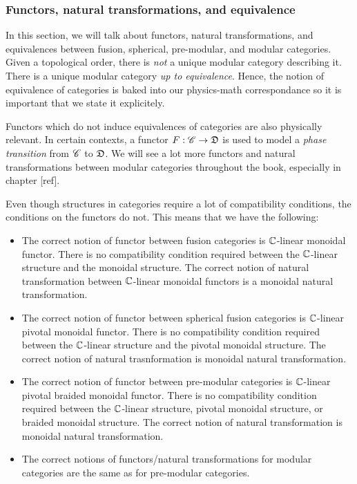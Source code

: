 \subsubsection{Functors, natural transformations, and equivalence}

In this section, we will talk about functors, natural transformations, and equivalences between fusion, spherical, pre-modular, and modular categories. Given a topological order, there is \textit{not} a unique modular category describing it. There is a unique modular category \textit{up to equivalence}. Hence, the notion of equivalence of categories is baked into our physics-math correspondance so it is important that we state it explicitely.

Functors which do not induce equivalences of categories are also physically relevant. In certain contexts, a functor $F:\mathscr{C}\to \mathfrak{D}$ is used to model a \textit{phase transition} from $\mathscr{C}$ to $\mathfrak{D}$. We will see a lot more functors and natural transformations between modular categories throughout the book, especially in chapter [ref].

Even though structures in categories require a lot of compatibility conditions, the conditions on the functors do not. This means that we have the following:

\begin{itemize}
\item The correct notion of functor between fusion categories is $\mathbb{C}$-linear monoidal functor. There is no compatibility condition required between the $\mathbb{C}$-linear structure and the monoidal structure. The correct notion of natural transformation between $\mathbb{C}$-linear monoidal functors is a monoidal natural transformation.

\item The correct notion of functor between spherical fusion categories is $\mathbb{C}$-linear pivotal monoidal functor. There is no compatibility condition required between the $\mathbb{C}$-linear structure and the pivotal monoidal structure. The correct notion of natural trasnformation is monoidal natural transformation.

\item The correct notion of functor between pre-modular categories is $\mathbb{C}$-linear pivotal braided monoidal functor. There is no compatibility condition required between the $\mathbb{C}$-linear structure, pivotal monoidal structure, or braided monoidal structure. The correct notion of natural transformation is monoidal natural transformation.

\item The correct notions of functors/natural transformations for modular categories are the same as for pre-modular categories.

\end{itemize}


